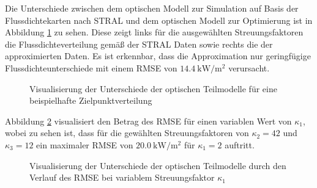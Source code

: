 Die Unterschiede zwischen dem optischen Modell zur Simulation auf Basis der Flussdichtekarten nach STRAL und dem optischen Modell zur Optimierung ist in Abbildung \ref{fig_UnterschiedoptischeModelle} zu sehen.
Diese zeigt links für die ausgewählten Streuungsfaktoren die Flussdichteverteilung gemäß der STRAL Daten sowie rechts die der approximierten Daten.
Es ist erkennbar, dass die Approximation nur geringfügige Flussdichteunterschiede mit einem RMSE von $\SI{14.4}{\kilo\watt\per\metre\squared}$ verursacht.


\begin{figure}[h!]
    \centering
    \setlength{\fboxsep}{1pt}
    \setlength{\fboxrule}{1pt}
    \caption[Visualisierung der Unterschiede der optischen Teilmodelle für eine beispielhafte Zielpunktverteilung]{Visualisierung der Unterschiede der optischen Teilmodelle für eine beispielhafte Zielpunktverteilung}
    \label{fig_UnterschiedoptischeModelle}
\end{figure}

Abbildung \ref{fig_RMSEüberdispersion} visualisiert den Betrag des RMSE für einen variablen Wert von $\kappa_1$, wobei zu sehen ist, dass für die gewählten Streuungsfaktoren von $\kappa_2 = 42$ und $\kappa_3 = 12$ ein maximaler RMSE von $\SI{20.0}{\kilo\watt\per\metre\squared}$ für $\kappa_1 = 2$ auftritt.

\begin{figure}[h!]
    \centering
    \setlength{\fboxsep}{1pt}
    \setlength{\fboxrule}{1pt}
\caption[Visualisierung der Unterschiede der optischen Teilmodelle durch den Verlauf des RMSE bei variablem Streuungsfaktor $\kappa_1$]{Visualisierung der Unterschiede der optischen Teilmodelle durch den Verlauf des RMSE bei variablem Streuungsfaktor $\kappa_1$}
    \label{fig_RMSEüberdispersion}
\end{figure}

